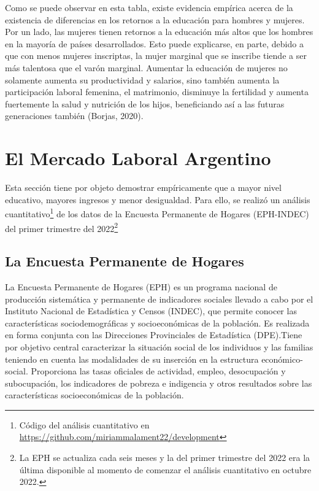 \documentclass[a4paper]{article}
\theoremstyle{plain}
\theoremstyle{definition}
\begin{document}
Como se puede observar en esta tabla, existe evidencia empírica acerca de la existencia de diferencias en los retornos a la educación para hombres y mujeres. Por un lado, las mujeres tienen retornos a la educación más altos que los hombres en la mayoría de países desarrollados. Esto puede explicarse, en parte, debido a que con menos mujeres inscriptas, la mujer marginal que se inscribe tiende a ser más talentosa que el varón marginal. Aumentar la educación de mujeres no solamente aumenta su productividad y salarios, sino también aumenta la participación laboral femenina, el matrimonio, disminuye la fertilidad y aumenta fuertemente la salud y nutrición de los hijos, beneficiando así a las futuras generaciones también (Borjas, 2020).  

\section{El Mercado Laboral Argentino}
\label{sec:metodologia}

Esta sección tiene por objeto demostrar empíricamente que a mayor nivel educativo, mayores ingresos y menor desigualdad. Para ello, se realizó un análisis cuantitativo\footnote{Código del análisis cuantitativo en \hyperref[https://github.com/miriammalament22/development]{https://github.com/miriammalament22/development}} de los datos de la Encuesta Permanente de Hogares (EPH-INDEC) del primer trimestre del 2022\footnote{La EPH se actualiza cada seis meses y la del primer trimestre del 2022 era la última disponible al momento de comenzar el análisis cuantitativo en octubre 2022.}

\subsection{La Encuesta Permanente de Hogares}
\label{sec:metodologia:sec1}

La Encuesta Permanente de Hogares (EPH) es un programa nacional de producción sistemática y permanente de indicadores sociales llevado a cabo por el Instituto Nacional de Estadística y Censos (INDEC), que permite conocer las características sociodemográficas y socioeconómicas de la población. Es realizada en forma conjunta con las Direcciones Provinciales de Estadística (DPE).Tiene por objetivo central caracterizar la situación social de los individuos y las familias teniendo en cuenta las modalidades de su inserción en la estructura económico-social. Proporciona las tasas oficiales de actividad, empleo, desocupación y subocupación, los indicadores de pobreza e indigencia y otros resultados sobre las características socioeconómicas de la población.
\end{document}
